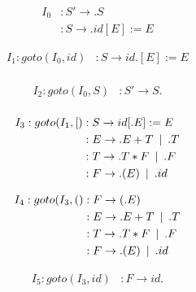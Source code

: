 \documentclass{article}
\newcommand\tab[1][5pt]{\hspace*{#1}}
\newcommand\sep{\tab | \tab }
\begin{document}
\begin{figure}[h!]
\begin{multicols}{2}
\begin{equation*}
\begin{aligned}
I_0 &: S' \rightarrow .S  \\
&: S \rightarrow .id[E] := E
\end{aligned}
\end{equation*}

\begin{equation*}
\begin{aligned}
I_1 : goto(I_0,id) &: S \rightarrow id.[E] :=E  \\
\end{aligned}
\end{equation*}

\begin{equation*}
\begin{aligned}
I_2 : goto(I_0,S) &: S' \rightarrow S.  \\
\end{aligned}
\end{equation*}

\begin{equation*}
\begin{aligned}
I_3 : goto(I_1,[) &: S \rightarrow id[.E] :=E  \\
&: E \rightarrow .E+T \tab | \tab .T \\
&: T \rightarrow .T*F \tab | \tab  .F \\
&: F \rightarrow .(E) \sep .id \\
\end{aligned}
\end{equation*}

\begin{equation*}
\begin{aligned}
I_4 : goto(I_3,() &: F \rightarrow (.E)  \\
&: E \rightarrow .E+T \tab | \tab .T \\
&: T \rightarrow .T*F \tab | \tab  .F \\
&: F \rightarrow .(E) \sep .id \\
\end{aligned}
\end{equation*}

\begin{equation*}
\begin{aligned}
I_5 : goto(I_3,id) &: F \rightarrow id.  \\
\end{aligned}
\end{equation*}


\end{multicols}
\end{figure}
\end{document}
